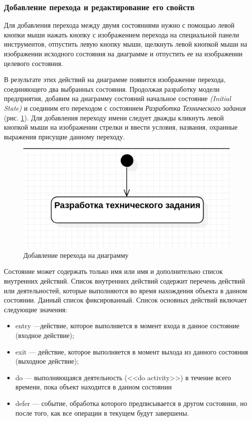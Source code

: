 \documentclass[a4paper,12pt]{extreport}
\begin{document}
\subsubsection*{Добавление перехода и редактирование его свойств}
Для добавления перехода между двумя состояниями нужно с помощью левой кнопки мыши нажать кнопку с изображением перехода на специальной панели инструментов, отпустить левую кнопку мыши, щелкнуть левой кнопкой мыши на изображении исходного состояния на диаграмме и отпустить ее на изображении целевого состояния. 

В результате этих действий на диаграмме появится изображение перехода, соединяющего два выбранных состояния. Продолжая разработку модели предприятия, добавим на диаграмму состояний начальное состояние \textit{(Initial State)} и соединим его переходом с состоянием \textit{Разработка Технического задания} (рис. \ref{fig:statechartfirst}). Для добавления переходу имени следует дважды кликнуть левой кнопкой мыши на изображении стрелки и ввести условия, названия, охранные выражения присущие данному переходу.

\begin{figure}[h!]
	\centering
	\includegraphics[width=0.5\linewidth]{images/statechartfirst}
	\caption{Добавление перехода на диаграмму}
	\label{fig:statechartfirst}
\end{figure}

Состояние может содержать только имя или имя и дополнительно список внутренних действий. Список внутренних действий содержит перечень действий или деятельностей, которые выполняются во время нахождения объекта в данном состоянии. Данный список фиксированный. Список основных действий включает следующие значения:
\begin{itemize}
	\item entry ---действие, которое выполняется в момент входа в данное состояние (входное действие);
	\item exit --- действие, которое выполняется в момент выхода из данного состояния (выходное действие);
	\item do --- выполняющаяся деятельность (<<do activity>>) в течение всего времени, пока объект находится в данном состоянии
	\item defer --- событие, обработка которого предписывается в другом состоянии, но после того, как все операции в текущем будут завершены.
\end{itemize}
\end{document}
